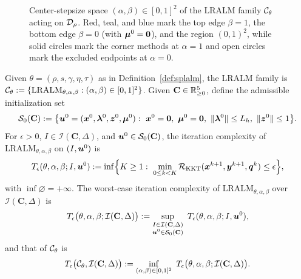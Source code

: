 \begin{figure}[t]
{%
}
\caption{Center-stepsize space \((\alpha,\beta)\in[0,1]^2\) of the LRALM family 
\(\mathcal{C}_\theta\) acting on \(\mathcal{D}_\rho\). Red, teal, and blue mark the top
edge \(\beta=1\), the bottom edge \(\beta=0\) (with \(\bm{\mu}^0=\bm{0}\)), and the
region \((0,1)^2\), while solid circles mark the corner methods at
\(\alpha=1\) and open circles mark the excluded endpoints at \(\alpha=0\).} 
\label{fig:lralm-family}
\end{figure} 

\begin{definition}
\label{def:complexity-measure}
Given \(\theta=(\rho,s,\gamma,\eta,\tau)\) as in Definition~\ref{def:splalm},
the LRALM family is
\(\mathcal{C}_\theta:=\{\mathrm{LRALM}_{\theta,\alpha,\beta}:(\alpha,\beta)\in[0,1]^2\}\).
Given \(\mathbf C\in\mathbb{R}^5_{\ge0}\), define the admissible initialization set
\[  
    \mathcal S_0(\mathbf C)
    :=\bigl\{\bu^0=(\bx^0,\blmbd^0,\bz^0,\bmu^0):\
        \bx^0=\zero,\ \bmu^0=\zero,\ \|\blmbd^0\|\le L_h,\ \|\bz^0\|\le1\bigr\}.
\]
For \(\epsilon>0\), \(I\in\mathcal I(\mathbf C,\Delta)\), and
\(\bm{u}^0\in\mathcal S_0(\mathbf C)\), the iteration complexity of 
\(\mathrm{LRALM}_{\theta,\alpha,\beta}\) on \((I,\bm{u}^0)\) is
\[
    T_\epsilon(\theta,\alpha,\beta;I,\bm{u}^0) 
    :=\inf\Bigl\{K\ge1:\ \min_{0\le k<K}
        \mathcal R_{\mathrm{KKT}}(\bm{x}^{k+1},\bm{y}^{k+1},\bm{q}^k)\le\epsilon\Bigr\},
\]
with \(\inf\varnothing=+\infty\). The worst-case iteration complexity of
\(\mathrm{LRALM}_{\theta,\alpha,\beta}\) over \(\mathcal I(\mathbf C,\Delta)\) is
\[
    T_\epsilon\bigl(\theta,\alpha,\beta;\mathcal I(\mathbf C,\Delta)\bigr)
    :=\sup_{\substack{I\in\mathcal I(\mathbf C,\Delta)\\ \bm{u}^0\in\mathcal S_0(\mathbf C)}}\
    T_\epsilon(\theta,\alpha,\beta;I,\bm{u}^0),
\] 
and that of \(\mathcal{C}_\theta\) is
\[
    T_\epsilon\bigl(\mathcal{C}_\theta,\mathcal I(\mathbf C,\Delta)\bigr)
    :=\inf_{(\alpha,\beta)\in[0,1]^2}\
    T_\epsilon\bigl(\theta,\alpha,\beta;\mathcal I(\mathbf C,\Delta)\bigr).
\]
\end{definition} 

